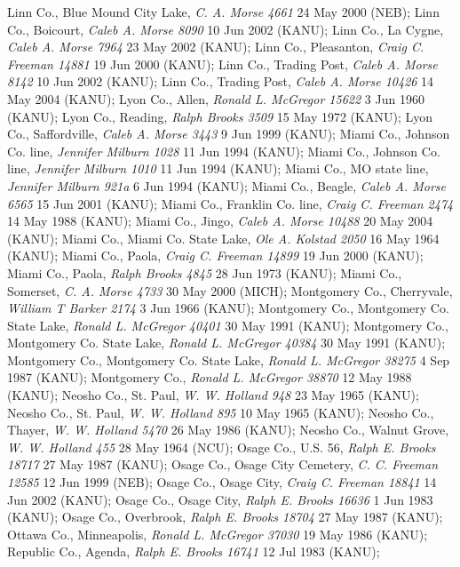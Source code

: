 \documentclass{article}
\begin{document}
Linn Co., Blue Mound City Lake, \textit{C. A. Morse 4661} 24 May 2000 (NEB); 
Linn Co., Boicourt, \textit{Caleb A. Morse 8090} 10 Jun 2002 (KANU); 
Linn Co., La Cygne, \textit{Caleb A. Morse 7964} 23 May 2002 (KANU); 
Linn Co., Pleasanton, \textit{Craig C. Freeman 14881} 19 Jun 2000 (KANU); 
Linn Co., Trading Post, \textit{Caleb A. Morse 8142} 10 Jun 2002 (KANU); 
Linn Co., Trading Post, \textit{Caleb A. Morse 10426} 14 May 2004 (KANU); 
Lyon Co., Allen, \textit{Ronald L. McGregor 15622} 3 Jun 1960 (KANU); 
Lyon Co., Reading, \textit{Ralph Brooks 3509} 15 May 1972 (KANU); 
Lyon Co., Saffordville, \textit{Caleb A. Morse 3443} 9 Jun 1999 (KANU); 
Miami Co., Johnson Co. line, \textit{Jennifer Milburn 1028} 11 Jun 1994 (KANU); 
Miami Co., Johnson Co. line, \textit{Jennifer Milburn 1010} 11 Jun 1994 (KANU); 
Miami Co., MO state line, \textit{Jennifer Milburn 921a} 6 Jun 1994 (KANU); 
Miami Co., Beagle, \textit{Caleb A. Morse 6565} 15 Jun 2001 (KANU); 
Miami Co., Franklin Co. line, \textit{Craig C. Freeman 2474} 14 May 1988 (KANU); 
Miami Co., Jingo, \textit{Caleb A. Morse 10488} 20 May 2004 (KANU); 
Miami Co., Miami Co. State Lake, \textit{Ole A. Kolstad 2050} 16 May 1964 (KANU); 
Miami Co., Paola, \textit{Craig C. Freeman 14899} 19 Jun 2000 (KANU); 
Miami Co., Paola, \textit{Ralph Brooks 4845} 28 Jun 1973 (KANU); 
Miami Co., Somerset, \textit{C. A. Morse 4733} 30 May 2000 (MICH); 
Montgomery Co., Cherryvale, \textit{William T Barker 2174} 3 Jun 1966 (KANU); 
Montgomery Co., Montgomery Co. State Lake, \textit{Ronald L. McGregor 40401} 30 May 1991 (KANU); 
Montgomery Co., Montgomery Co. State Lake, \textit{Ronald L. McGregor 40384} 30 May 1991 (KANU); 
Montgomery Co., Montgomery Co. State Lake, \textit{Ronald L. McGregor 38275} 4 Sep 1987 (KANU); 
Montgomery Co., \textit{Ronald L. McGregor 38870} 12 May 1988 (KANU); 
Neosho Co., St. Paul, \textit{W. W. Holland 948} 23 May 1965 (KANU); 
Neosho Co., St. Paul, \textit{W. W. Holland 895} 10 May 1965 (KANU); 
Neosho Co., Thayer, \textit{W. W. Holland 5470} 26 May 1986 (KANU); 
Neosho Co., Walnut Grove, \textit{W. W. Holland 455} 28 May 1964 (NCU); 
Osage Co., U.S. 56, \textit{Ralph E. Brooks 18717} 27 May 1987 (KANU); 
Osage Co., Osage City Cemetery, \textit{C. C. Freeman 12585} 12 Jun 1999 (NEB); 
Osage Co., Osage City, \textit{Craig C. Freeman 18841} 14 Jun 2002 (KANU); 
Osage Co., Osage City, \textit{Ralph E. Brooks 16636} 1 Jun 1983 (KANU); 
Osage Co., Overbrook, \textit{Ralph E. Brooks 18704} 27 May 1987 (KANU); 
Ottawa Co., Minneapolis, \textit{Ronald L. McGregor 37030} 19 May 1986 (KANU); 
Republic Co., Agenda, \textit{Ralph E. Brooks 16741} 12 Jul 1983 (KANU); 
\end{document}
